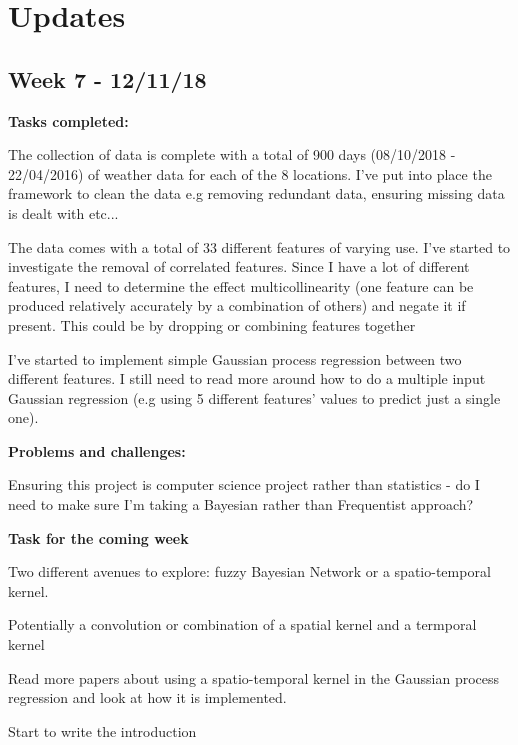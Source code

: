 \label{ch:updates} 



\section{Updates}

\subsection*{\indent Week 7 - 12/11/18}


\textbf{Tasks completed:}

The collection of data is complete with a total of 900 days (08/10/2018 - 22/04/2016) of weather data for each of the 8 locations. I've put into place the framework to clean the data e.g removing redundant data, ensuring missing data is dealt with etc...

The data comes with a total of 33 different features of varying use. I've started to investigate the removal of correlated features. Since I have a lot of different features, I need to determine the effect multicollinearity (one feature can be  produced relatively accurately by a combination of others) and negate it if present. This could be by dropping or combining features together

I've started to implement simple Gaussian process regression between two different features. I still need to read more around how to do a multiple input Gaussian regression (e.g using 5 different features' values to predict just a single one). 


\textbf{Problems and challenges:}


Ensuring this project is computer science project rather than statistics -  do I need to make sure I'm taking a Bayesian rather than Frequentist approach?

\textbf{Task for the coming week}


Two different avenues to explore: fuzzy Bayesian Network or a spatio-temporal kernel.

Potentially a convolution or combination of a spatial kernel and a termporal kernel 


Read more papers about using a spatio-temporal kernel in the Gaussian process regression and look at how it is implemented.



Start to write the introduction 